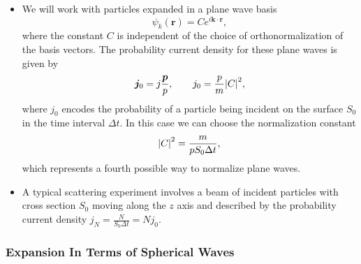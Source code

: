 \documentclass[11pt, a4paper]{article}
\renewcommand{\vec}[1]{\bm{#1}}  %
\renewcommand{\r}{\vec{r}}  %
\begin{document}
\begin{itemize}
\begin{itemize}
    \end{itemize}

    \item We will work with particles expanded in a plane wave basis
    \begin{equation*}
        \psi_{k}(\r) = C e^{i \vec{k} \cdot \r},
    \end{equation*}
    where the constant $ C $ is independent of the choice of orthonormalization of the basis vectors. The probability current density for these plane waves is given by
    \begin{equation*}
        \vec{j}_{0} = j_{} \frac{\vec{p}}{p}, \qquad j_{0} = \frac{p}{m} \abs{C}^{2},
    \end{equation*}
    where $ j_{0} $ encodes the probability of a particle being incident on the surface $ S_{0} $ in the time interval $ \Delta t $. In this case we can choose the normalization constant 
    \begin{equation*}
        \abs{C}^{2} = \frac{m}{pS_{0}\Delta t},
    \end{equation*}
    which represents a fourth possible way to normalize plane waves. 

    \item A typical scattering experiment involves a beam of incident particles with cross section $ S_{0} $ moving along the $ z $ axis and described by the probability current density $ j_{N} = \frac{N}{S_{0} \Delta t} = N j_{0} $.
    
\end{itemize}

\subsubsection{Expansion In Terms of Spherical Waves}
\end{document}
